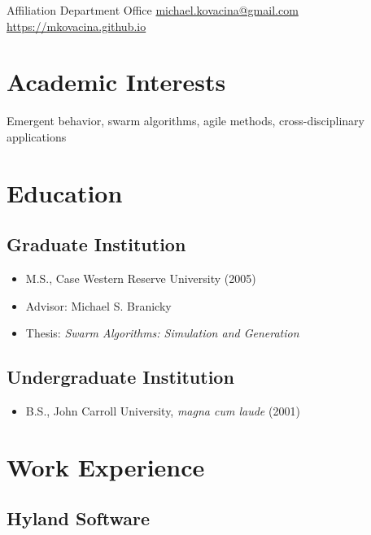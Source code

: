 \documentclass{cv_style}
\begin{document}

    \begin{center}  

    \contact
		{Affiliation}
		{Department}
		{Office}
		{\href{mailto:michael.kovacina@gmail.com}{michael.kovacina@gmail.com}}
		{\href{https://mkovacina.github.io}{https://mkovacina.github.io}}

	\end{center}
	
	\section{Academic Interests}
	Emergent behavior, swarm algorithms, agile methods, cross-disciplinary applications

	\section{Education}
		\subsection{Graduate Institution}
				\begin{itemize}
					\item M.S., Case Western Reserve University (2005)
					\item Advisor: Michael S. Branicky
					\item Thesis: {\em Swarm Algorithms: Simulation and Generation}
				\end{itemize}
				
		\subsection{Undergraduate Institution}
				\begin{itemize}
					\item B.S., John Carroll University, \textit{magna cum laude} (2001)
				\end{itemize}
		
	\section{Work Experience}
		\subsection{Hyland Software}
\end{document}
